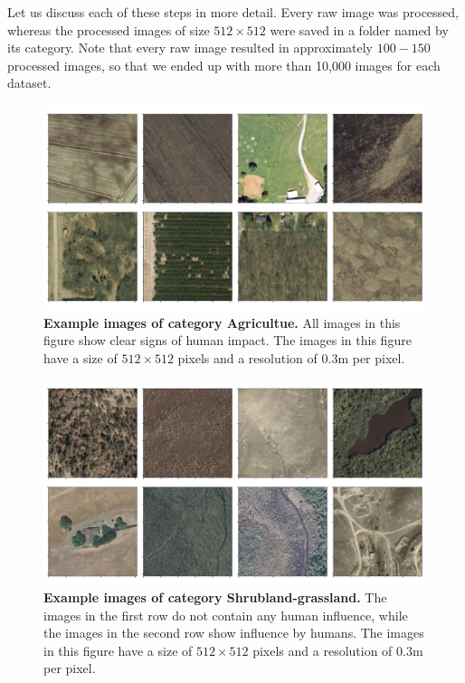 Let us discuss each of these steps in more detail. Every raw image was processed, whereas the processed images of size $512\times512$ were saved in a folder named by its category. Note that every raw image resulted in approximately $100 - 150$ processed images, so that we ended up with more than 10,000 images for each dataset.

\begin{figure}%
	\centering
	\captionsetup{width=1\linewidth}
	\includegraphics[width=1\textwidth]{Figures/agriculture_sample.pdf}
	\caption{\textbf{Example images of category Agricultue.} All images in this figure show clear signs of human impact. The images in this figure have a size of $512\times512$ pixels and a resolution of $0.3$m per pixel.}
	\label{fig:agriculture_sample}
\end{figure}

\begin{figure}%
	\centering
	\captionsetup{width=1\linewidth}
	\includegraphics[width=1\textwidth]{Figures/shrubland-grassland_sample.pdf}
	\caption{\textbf{Example images of category Shrubland-grassland.} The images in the first row do not contain any human influence, while the images in the second row show influence by humans. The images in this figure have a size of $512\times512$ pixels and a resolution of $0.3$m per pixel.}
	\label{fig:shrubland-sample}
\end{figure}

